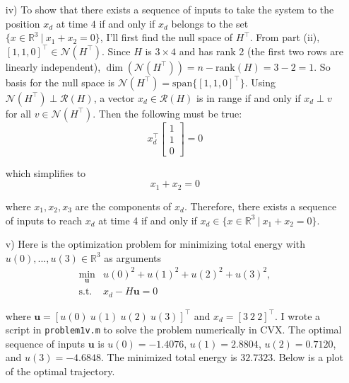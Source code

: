 \begin{homeworkProblem}
\begin{solution}
\begin{itemize}
            \item[iv)] To show that there exists a sequence of inputs to take 
                the system to the position $x_d$ at time $4$ if and only if 
                $x_d$ belongs to the set $\{x\in\mathbb R^3\ | \ x_1+x_2=0\}$, 
                I'll first find the null space of $H^\top$. From part (ii), 
                $[1, 1, 0]^\top \in \mathcal{N}(H^\top)$. Since $H$ is 
                $3 \times 4$ and has rank 2 (the first two rows are linearly 
                independent), $\dim(\mathcal{N}(H^\top)) = n - \text{rank}(H) = 
                3 - 2 = 1$. So basis for the null space is $\mathcal{N}(H^\top) = 
                \text{span}\{[1, 1, 0]^\top\}$. Using $\mathcal{N}(H^\top) \perp 
                \mathcal{R}(H)$, a vector $x_d \in \mathcal{R}(H)$ is in range 
                if and only if $x_d \perp v$ for all $v \in \mathcal{N}(H^\top)$. 
                Then the following must be true:
                \[
                    x_d^\top \left[\begin{array}{c} 1 \\ 1 \\ 0 \end{array} \right] = 0
                \]

                which simplifies to
                \[
                    x_1 + x_2 = 0
                \]

                where $x_1, x_2, x_3$ are the components of $x_d$. Therefore, 
                there exists a sequence of inputs to reach $x_d$ at time 4 if 
                and only if $x_d \in \{x \in \mathbb{R}^3\ | \ x_1 + x_2 = 0\}$.

            
            \item[v)] Here is the optimization problem for minimizing total 
                energy with $u(0),..., u(3) \in \mathbb{R}^3$ as arguments
                \[
                    \begin{array}{rl}
                        \min\limits_{\boldsymbol{u}} & u(0)^2 + u(1)^2 + u(2)^2 + u(3)^2, \\ [2ex]
                        \text{s.t.} & x_d - H \boldsymbol{u} = 0
                    \end{array}
                \]

                where $\boldsymbol{u} = [u(0) \ u(1) \ u(2) \ u(3)]^\top$ and
                $x_d = [3 \ 2 \ 2]^\top$. I wrote a script in \texttt{problem1v.m}
                to solve the problem numerically in CVX. The optimal sequence 
                of inputs $\boldsymbol{u}$ is $u(0) = -1.4076$, $u(1) = 
                2.8804$, $u(2) = 0.7120$, and $u(3) = -4.6848$. The minimized 
                total energy is $32.7323$. Below is a plot of the optimal 
                trajectory.
                

\end{itemize}
\end{solution}
\end{homeworkProblem}

